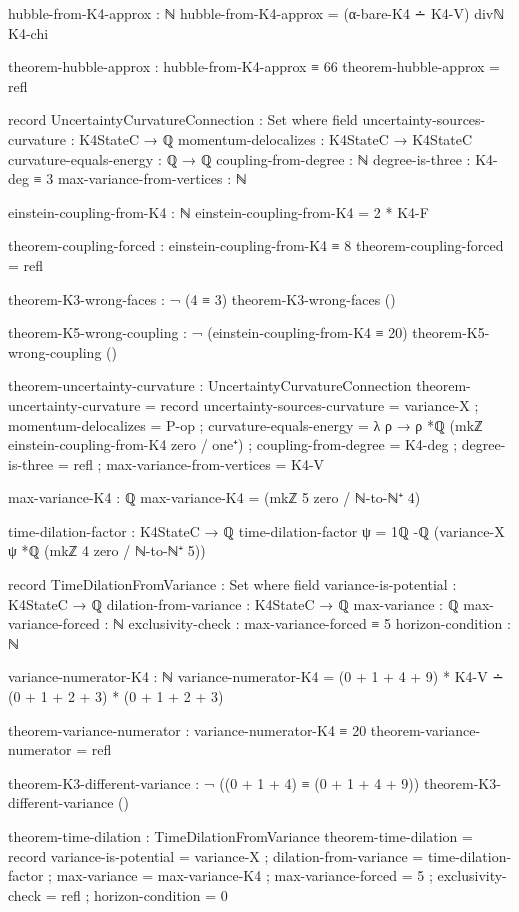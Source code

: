 \documentclass[11pt,a4paper]{book}
\begin{document}
\begin{code}
hubble-from-K4-approx : ℕ
hubble-from-K4-approx = (α-bare-K4 ∸ K4-V) divℕ K4-chi

theorem-hubble-approx : hubble-from-K4-approx ≡ 66
theorem-hubble-approx = refl

record UncertaintyCurvatureConnection : Set where
  field
    uncertainty-sources-curvature : K4StateC → ℚ
    momentum-delocalizes : K4StateC → K4StateC  
    curvature-equals-energy : ℚ → ℚ
    coupling-from-degree : ℕ
    degree-is-three : K4-deg ≡ 3
    max-variance-from-vertices : ℕ

einstein-coupling-from-K4 : ℕ
einstein-coupling-from-K4 = 2 * K4-F

theorem-coupling-forced : einstein-coupling-from-K4 ≡ 8
theorem-coupling-forced = refl

theorem-K3-wrong-faces : ¬ (4 ≡ 3)
theorem-K3-wrong-faces ()

theorem-K5-wrong-coupling : ¬ (einstein-coupling-from-K4 ≡ 20)
theorem-K5-wrong-coupling ()

theorem-uncertainty-curvature : UncertaintyCurvatureConnection
theorem-uncertainty-curvature = record
  { uncertainty-sources-curvature = variance-X
  ; momentum-delocalizes = P-op
  ; curvature-equals-energy = λ ρ → ρ *ℚ (mkℤ einstein-coupling-from-K4 zero / one⁺)
  ; coupling-from-degree = K4-deg
  ; degree-is-three = refl
  ; max-variance-from-vertices = K4-V
  }

max-variance-K4 : ℚ
max-variance-K4 = (mkℤ 5 zero / ℕ-to-ℕ⁺ 4)

time-dilation-factor : K4StateC → ℚ
time-dilation-factor ψ = 1ℚ -ℚ (variance-X ψ *ℚ (mkℤ 4 zero / ℕ-to-ℕ⁺ 5))


record TimeDilationFromVariance : Set where
  field
    variance-is-potential : K4StateC → ℚ
    dilation-from-variance : K4StateC → ℚ
    max-variance : ℚ
    max-variance-forced : ℕ
    exclusivity-check : max-variance-forced ≡ 5
    horizon-condition : ℕ

variance-numerator-K4 : ℕ
variance-numerator-K4 = (0 + 1 + 4 + 9) * K4-V ∸ (0 + 1 + 2 + 3) * (0 + 1 + 2 + 3)

theorem-variance-numerator : variance-numerator-K4 ≡ 20
theorem-variance-numerator = refl

theorem-K3-different-variance : ¬ ((0 + 1 + 4) ≡ (0 + 1 + 4 + 9))
theorem-K3-different-variance ()

theorem-time-dilation : TimeDilationFromVariance
theorem-time-dilation = record
  { variance-is-potential = variance-X
  ; dilation-from-variance = time-dilation-factor
  ; max-variance = max-variance-K4
  ; max-variance-forced = 5
  ; exclusivity-check = refl
  ; horizon-condition = 0
  }




\end{code}
\end{document}
